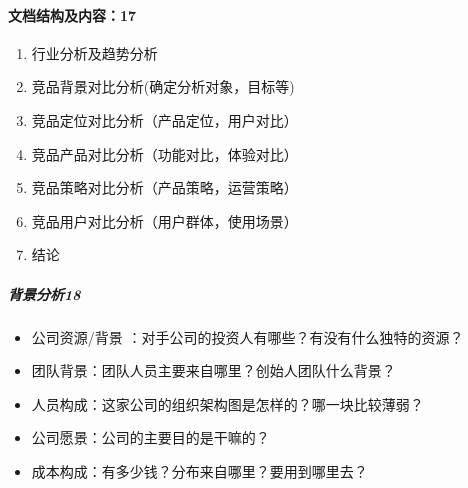 \documentclass[letterpaper,10pt,english]{sphinxmanual}
\begin{document}
\paragraph{文档结构及内容：17\sphinxfootnotemark[520]}
\label{\detokenize{chapter_knowledge/goods_analysis:id4}}%
\begin{footnotetext}[520]\sphinxAtStartFootnote
{}
%
\end{footnotetext}\ignorespaces \begin{enumerate}
%
\item {} 
行业分析及趋势分析

\item {} 
竞品背景对比分析(确定分析对象，目标等)

\item {} 
竞品定位对比分析（产品定位，用户对比）

\item {} 
竞品产品对比分析（功能对比，体验对比）

\item {} 
竞品策略对比分析（产品策略，运营策略）

\item {} 
竞品用户对比分析（用户群体，使用场景）

\item {} 
结论

\end{enumerate}


\subparagraph{背景分析18\sphinxfootnotemark[521]}
\label{\detokenize{chapter_knowledge/goods_analysis:id5}}%
\begin{footnotetext}[521]\sphinxAtStartFootnote
{}
%
\end{footnotetext}\ignorespaces \begin{itemize}
\item {} 
公司资源/背景 ：对手公司的投资人有哪些？有没有什么独特的资源？

\item {} 
团队背景：团队人员主要来自哪里？创始人团队什么背景？

\item {} 
人员构成：这家公司的组织架构图是怎样的？哪一块比较薄弱？

\item {} 
公司愿景：公司的主要目的是干嘛的？

\item {} 
成本构成：有多少钱？分布来自哪里？要用到哪里去？

\end{itemize}
\end{document}
